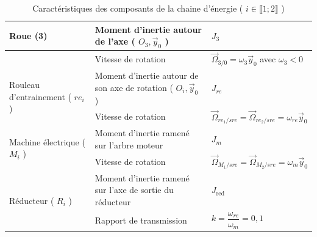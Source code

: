 \begin{table}[h]
\begin{center}
\begin{tabular}{|l|l|l|}
\hline
\multirow{2}{*}{Roue (3)} & Moment d'inertie autour de l'axe ( $O_{3}, \vec{y}_{0}$ ) & $J_{3}$ \\
\hline
 & Vitesse de rotation & $\vec{\Omega}_{3 / 0}=\omega_{3} \vec{y}_{0}$ avec $\omega_{3}<0$ \\
\hline
\multirow{2}{*}{Rouleau d'entrainement ( $r e_{i}$ )} & Moment d'inertie autour de son axe de rotation ( $O_{i}, \vec{y}_{0}$ ) & $J_{r e}$ \\
\hline
 & Vitesse de rotation & $\vec{\Omega}_{r e_{1} / s r e}=\vec{\Omega}_{r e_{2} / s r e}=\omega_{r e} \vec{y}_{0}$ \\
\hline
\multirow{2}{*}{Machine électrique ( $M_{i}$ )} & Moment d'inertie ramené sur l'arbre moteur & $J_{m}$ \\
\hline
 & Vitesse de rotation & $\vec{\Omega}_{M_{1} / s r e}=\vec{\Omega}_{M_{2} / s r e}=\omega_{m} \vec{y}_{0}$ \\
\hline
\multirow{2}{*}{Réducteur ( $R_{i}$ )} & Moment d'inertie ramené sur l'axe de sortie du réducteur & $J_{\text {red }}$ \\
\hline
 & Rapport de transmission & $k=\dfrac{\omega_{r e}}{\omega_{m}}=0,1$ \\
\hline
\end{tabular}
\caption{\label{ccs_psi_2018_tab_01}Caractéristiques des composants de la chaine d'énergie ( $i \in \llbracket 1 ; 2 \rrbracket$ )}
\end{center}
\end{table}




